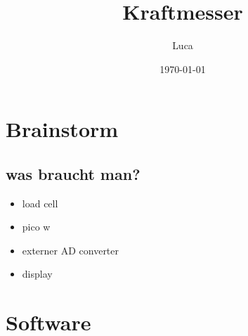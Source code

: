 \documentclass[11pt]{article}
\author{Luca}
\date{\today}
\title{Kraftmesser}
\begin{document}
\maketitle
\tableofcontents

\section{Brainstorm}
\label{sec:org3b6239e}
\subsection{was braucht man?}
\label{sec:org7164874}
\begin{itemize}
\item load cell
\item pico w
\item externer AD converter
\item display
\end{itemize}
\section{Software}
\label{sec:org08a06ca}
\end{document}
